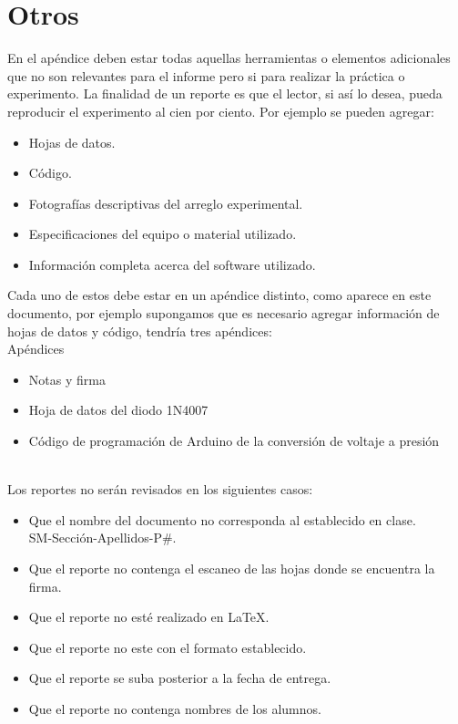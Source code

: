\documentclass[letterpaper, 11pt]{article}
\begin{document}
\section{Otros}
En el apéndice deben estar todas aquellas herramientas o elementos adicionales que no  son relevantes para el informe pero si para realizar la práctica o experimento. La finalidad de  un reporte es que el lector, si así lo desea, pueda reproducir el experimento al cien por ciento. Por ejemplo se pueden agregar:
\begin{itemize}	%
\item Hojas de datos.
\item Código.
\item Fotografías descriptivas del arreglo experimental.
\item Especificaciones del equipo o  material utilizado.
\item Información completa acerca del software utilizado.
\end{itemize}
Cada uno de estos debe estar en un apéndice  distinto, como aparece en este documento, por ejemplo supongamos que es necesario agregar información de hojas de datos  y código, tendría tres apéndices:\\[4mm]
\large Apéndices
\normalsize
\begin{itemize}
\item[A.] Notas y firma
\item[B.] Hoja de datos del diodo 1N4007
\item[C.] Código de programación de Arduino de la conversión de voltaje a presión
\end{itemize}
\noindent
\\[3mm]
Los reportes no serán revisados en los siguientes casos:
\begin{itemize}
\item Que el nombre del documento no corresponda  al establecido en clase. \\SM-Sección-Apellidos-P\#.
\item Que el reporte no contenga el escaneo de las hojas donde se encuentra la firma.
\item Que el reporte no esté realizado en \LaTeX .
\item Que el reporte no este con el formato establecido.
\item Que el reporte se suba posterior a la fecha de entrega.
\item Que el reporte no  contenga nombres de los  alumnos.
\end{itemize}
\end{document}
